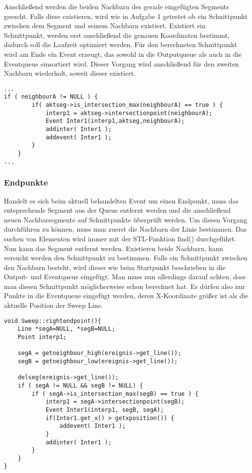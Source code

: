 Anschließend werden die beiden Nachbarn des gerade eingefügten Segments gesucht. Falls diese existieren, wird wie in Aufgabe 1 getestet ob ein Schnittpunkt zwischen dem Segment und seinem Nachbarn existiert. Existiert ein Schnittpunkt, werden erst anschließend die genauen Koordinaten bestimmt, dadurch soll die Laufzeit optimiert werden. Für den berechneten Schnittpunkt wird am Ende ein Event erzeugt, das sowohl in die Outputqueue als auch in die Eventqueue einsortiert wird.
Dieser Vorgang wird anschließend für den zweiten Nachbarn wiederholt, soweit dieser existiert.
\begin{lstlisting}[captionpos=b, caption={Schnittpunktprüfug bei Startpunkten}, label=A3:Behandlung_Start]
...
if ( neighbourA != NULL ) {
		if( aktseg->is_intersection_max(neighbourA) == true ) {
			interp1 = aktseg->intersectionpoint(neighbourA);
			Event Inter1(interp1,aktseg,neighbourA);
			addinter( Inter1 );
			addevent( Inter1 );
		}
	}
...
\end{lstlisting}

\subsubsection{Endpunkte}
Handelt es sich beim aktuell behandelten Event um einen Endpunkt, muss das entsprechende Segment aus der Queue entfernt werden und die anschließend neuen Nachbarsegmente auf Schnittpunkte überprüft werden. Um diesen Vorgang durchführen zu können, muss man zuerst die Nachbarn der Linie bestimmen. Das suchen von Elementen wird immer mit der STL-Funktion find() durchgeführt. Nun kann das Segment entfernt werden. Existieren beide Nachbarn, kann versucht werden den Schnittpunkt zu bestimmen. Falls ein Schnittpunkt zwischen den Nachbarn besteht, wird dieser wie beim Startpunkt beschrieben in die Output- und Eventqueue eingefügt. Man muss nun allerdings darauf achten, dass man diesen Schnittpunkt möglicherweise schon berechnet hat. Es dürfen also nur Punkte in die Eventqueue eingefügt werden, deren X-Koordinate größer ist als die aktuelle Position der Sweep Line.

\begin{lstlisting}[captionpos=b, caption={Behandlung von Endpunkten}, label=A3:Behandlung_End]
void Sweep::rightendpoint(){
	Line *segA=NULL, *segB=NULL;
	Point interp1;

	segA = getneighbour_high(ereignis->get_line());
	segB = getneighbour_low(ereignis->get_line());

	delseg(ereignis->get_line());
	if ( segA != NULL && segB != NULL) {
		if ( segA->is_intersection_max(segB) == true ) {
			interp1 = segA->intersectionpoint(segB);
			Event Inter1(interp1, segB, segA);
			if(Inter1.get_x() > getxposition()) {
				addevent( Inter1 );
			}
			addinter( Inter1 );
		}
	}
}
\end{lstlisting}

